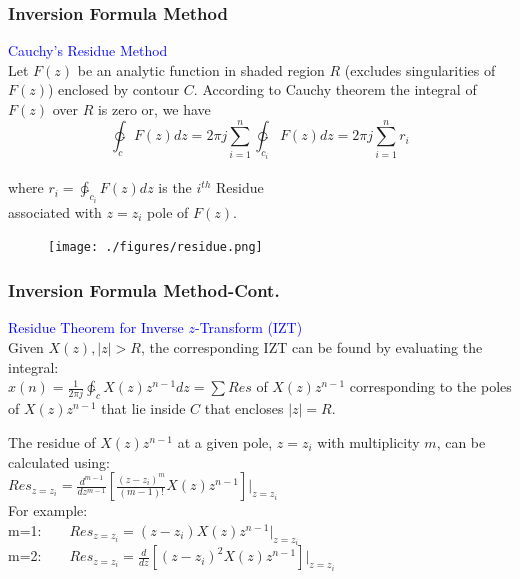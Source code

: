 \documentclass[mathserif, 10pt]{beamer} %
\begin{document}
\frame
{

\normalsize

\frametitle{Inversion Formula Method}


\textcolor{blue}{Cauchy's Residue Method} \\

\vspace{.05in}
Let $F(z)$ be an analytic function in shaded region $R$ (excludes singularities of $F(z)$) enclosed by contour $C$.  According to Cauchy theorem the integral of $F(z)$ over $R$ is zero or, we have\\
\vspace{.05in}
\[\ointctrclockwise_c F(z) dz = 2 \pi j \sum\limits_{i=1}^n \ointctrclockwise_{c_i} F(z) dz= 2 \pi j \sum\limits_{i=1}^n r_i\] \\

\vspace{.05in}
where $r_i = \ointctrclockwise_{c_i} F(z) dz$ is the $i^{th}$ Residue \\
associated with $z=z_i$ pole of $F(z)$.




\vspace{-.47in}
\begin{figure}[h!]
\centering
\hspace{2in}
\texttt{[image: ./figures/residue.png]}
\end{figure}




}
\frame
{

\normalsize

\frametitle{Inversion Formula Method-Cont.}

\textcolor{blue}{Residue Theorem for Inverse $z$-Transform (IZT)}\\

\vspace{.05in}
Given $X(z),|z|>R$, the corresponding IZT can be found by evaluating the integral:\\ \vspace{.2in}
$x(n) = \frac{1}{2 \pi j} \ointctrclockwise_c X(z) z^{n-1}dz = \sum Res$ of $X(z)z^{n-1}$ corresponding to the poles of $X(z)z^{n-1}$ that lie inside $C$ that encloses $|z|=R$.\\ \vspace{.2in}

The residue of $X(z)z^{n-1}$ at a given pole, $z=z_i$ with multiplicity $m$, can be calculated using:\\
$Res_{z=z_i}=\frac{d^{m-1}}{dz^{m-1}} \left [\frac{(z-z_i)^m}{(m-1)!} X(z)z^{n-1} \right ] \bigg |_{z=z_i}$\\

For example:\\
m=1:~~~~$Res_{z=z_i} = (z-z_i)X(z)z^{n-1} |_{z=z_i}$\\
m=2:~~~~$Res_{z=z_i} = \frac{d}{dz} [(z-z_i)^2X(z)z^{n-1}] |_{z=z_i}$\\


}
\end{document}
